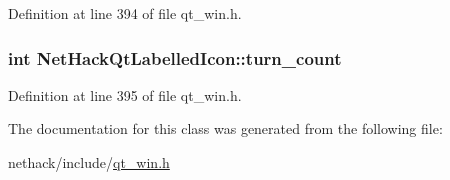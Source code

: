 Definition at line 394 of file qt\+\_\+win.\+h.

\hypertarget{classNetHackQtLabelledIcon_ae4eb385095d1e0b90e863947359cf135}{
\subsubsection[{turn\+\_\+count}]{\setlength{\rightskip}{0pt plus 5cm}int Net\+Hack\+Qt\+Labelled\+Icon\+::turn\+\_\+count\hspace{0.3cm}{\ttfamily [private]}}}\label{classNetHackQtLabelledIcon_ae4eb385095d1e0b90e863947359cf135}


Definition at line 395 of file qt\+\_\+win.\+h.



The documentation for this class was generated from the following file\+:\begin{DoxyCompactItemize}
\item 
nethack/include/\hyperlink{qt__win_8h}{qt\+\_\+win.\+h}\end{DoxyCompactItemize}
